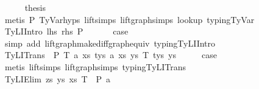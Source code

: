 \begin{isabellebody}
\ \ \ \ \isamarkupfalse%
\ {\isacharquery}{\kern0pt}thesis\isanewline
\ \ \ \ \ \ \isamarkupfalse%
\ {\isacharparenleft}{\kern0pt}metis\ P{}\ TyVar{\isachardot}{\kern0pt}hyps{\isacharparenleft}{\kern0pt}{}{\isacharcomma}{\kern0pt}{}{\isacharcomma}{\kern0pt}{}{\isacharcomma}{\kern0pt}{}{\isacharparenright}{\kern0pt}\ lift{\isachardot}{\kern0pt}simps{\isacharparenleft}{\kern0pt}{}{\isacharparenright}{\kern0pt}\ lift{\isacharunderscore}{\kern0pt}graph{\isachardot}{\kern0pt}simps{\isacharparenleft}{\kern0pt}{}{\isacharparenright}{\kern0pt}\ lookup\ typing{\isachardot}{\kern0pt}TyVar{\isacharparenright}{\kern0pt}\isanewline
\ \ \isamarkupfalse%
\isanewline
\isanewline
{}\isamarkupfalse%
\isanewline
\ \ \isamarkupfalse%
\ {\isacharparenleft}{\kern0pt}TyLIIntro\ lhs\ rhs\ P\ {\isasymGamma}{\isacharparenright}{\kern0pt}\isanewline
\ \ \isamarkupfalse%
\ \isamarkupfalse%
\ {\isacharquery}{\kern0pt}case\isanewline
\ \ \ \ \isamarkupfalse%
\ {\isacharparenleft}{\kern0pt}simp\ add{\isacharcolon}{\kern0pt}\ lift{\isacharunderscore}{\kern0pt}graph{\isacharunderscore}{\kern0pt}make{\isacharunderscore}{\kern0pt}diffgraph{\isacharunderscore}{\kern0pt}equiv\ typing{\isachardot}{\kern0pt}TyLIIntro{\isacharparenright}{\kern0pt}\isanewline
\isanewline
{}\isamarkupfalse%
\isanewline
\ \ \isamarkupfalse%
\ {\isacharparenleft}{\kern0pt}TyLITrans\ {\isasymGamma}\ P\ T{}\ a{}\ xs{}\ tys{}\ a{}\ xs{}\ ys{}\ T{}\ tys{}\ ys{}{\isacharparenright}{\kern0pt}\isanewline
\ \ \isamarkupfalse%
\ \isamarkupfalse%
\ {\isacharquery}{\kern0pt}case\isanewline
\ \ \isamarkupfalse%
\ {\isacharparenleft}{\kern0pt}metis\ lift{\isachardot}{\kern0pt}simps{\isacharparenleft}{\kern0pt}{}{\isacharparenright}{\kern0pt}\ lift{\isacharunderscore}{\kern0pt}graph{\isachardot}{\kern0pt}simps{\isacharparenleft}{\kern0pt}{}{\isacharparenright}{\kern0pt}\ typing{\isachardot}{\kern0pt}TyLITrans{\isacharparenright}{\kern0pt}\isanewline
{}\isamarkupfalse%
\isanewline
\ \ \isamarkupfalse%
\ {\isacharparenleft}{\kern0pt}TyLIElim{}\ zs\ ys{\isacharprime}{\kern0pt}\ xs\ T\ {\isasymGamma}\ P\ a{\isacharparenright}{\kern0pt}\isanewline

\end{isabellebody}
